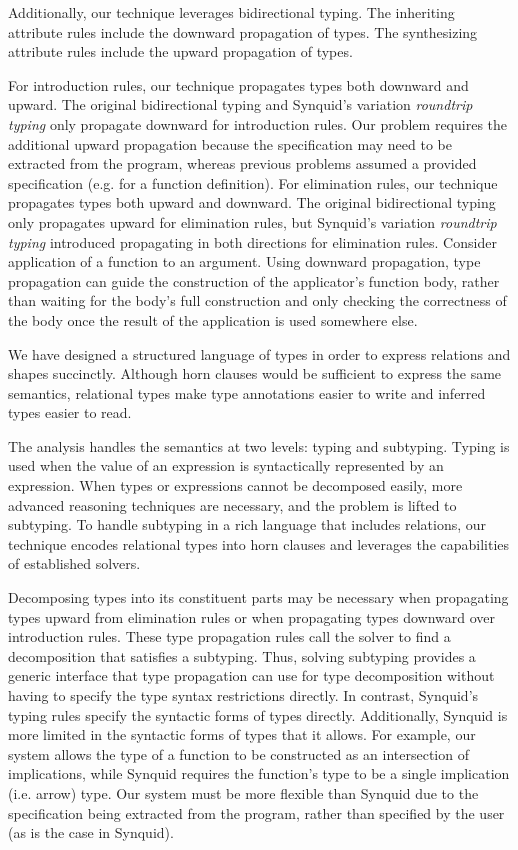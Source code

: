 \documentclass[sigplan,screen,review]{acmart}
\begin{document}
Additionally, our technique leverages bidirectional typing.
The inheriting attribute rules include the downward propagation of types. 
The synthesizing attribute rules include the upward propagation of types. 

For introduction rules, our technique propagates types both downward and upward.
The original bidirectional typing and Synquid's variation \textit{roundtrip typing} only propagate downward for introduction rules. 
Our problem requires the additional upward propagation because the specification may need to be extracted from the program,
whereas previous problems assumed a provided specification (e.g. for a function definition).
For elimination rules, our technique propagates types both upward and downward.
The original bidirectional typing only propagates upward for elimination rules, but Synquid's variation \textit{roundtrip typing} 
introduced propagating in both directions for elimination rules.
Consider application of a function to an argument. Using downward propagation, 
type propagation can guide the construction of the applicator's function body,
rather than waiting for the body's full construction and only checking the correctness of the body 
once the result of the application is used somewhere else. 

We have designed a structured language of types in order to express relations and shapes succinctly.
Although horn clauses would be sufficient to express the same semantics, relational types make type annotations easier to write
and inferred types easier to read.

The analysis handles the semantics at two levels: typing and subtyping. Typing is used when the value of an expression
is syntactically represented by an expression. When types or expressions cannot be decomposed easily, more advanced
reasoning techniques are necessary, and the problem is lifted to subtyping. To handle subtyping in a rich language that includes  
relations, our technique encodes relational types into horn clauses and leverages the capabilities of established solvers.

Decomposing types into its constituent parts may be necessary when propagating
types upward from elimination rules or when propagating types downward over introduction rules. 
These type propagation rules call the solver to find a decomposition that satisfies a subtyping. 
Thus, solving subtyping provides a generic interface that type propagation can use for type decomposition
without having to specify the type syntax restrictions directly. 
In contrast, Synquid's typing rules specify the syntactic forms of types directly.
Additionally, Synquid is more limited in the syntactic forms of types that it allows.
For example, our system allows the type of a function to be constructed as an intersection of implications,
while Synquid requires the function's type to be a single implication (i.e. arrow) type.
Our system must be more flexible than Synquid due to the specification being extracted from the program,
rather than specified by the user (as is the case in Synquid).
\end{document}
